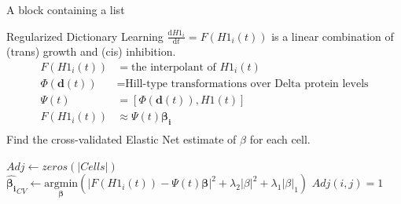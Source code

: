 \documentclass[final]{beamer}
\newlength{\colwidth}
\begin{document}
\begin{frame}[t]
\begin{columns}[t]
\begin{column}{\colwidth}
\begin{block}{A block containing a list}
  \end{block}

  \begin{alertblock}{Regularized Dictionary Learning}
    $\frac{\mathrm d \textit{H1}_i}{\mathrm dt} = F(\textit{H1}_i(t))$ is a linear combination of (trans) growth and (cis) inhibition.
    \begin{equation}\label{eq:state}
    \begin{split}
    F(\textit{H1}_i(t)) &= \text{the interpolant of } \textit{H1}_i(t)\\
    \Phi(\bm{d}(t)) &= \text{Hill-type transformations over Delta protein levels} \\
    \Psi(t) &=  \left[\Phi(\bm{d}(t)), \textit{H1}(t) \right] \\
    F(\textit{H1}_i(t)) &\approx \Psi(t) \bm{\beta_i} \\[1em]
    \end{split}
    \end{equation}
    Find the cross-validated Elastic Net estimate \cite{zou_regularization_2005} of $\beta$ for each cell.\\[1em]	
    \centering
    \begin{minipage}{0.7\textwidth}
      \begin{algorithmic}
        \STATE $Adj\gets zeros(|Cells|)$
        \STATE $\bm{\hat{\beta_i}}_{CV} \gets \underset{\bm{\beta}}{\mathrm{argmin}} \left( \big|F(H1_i(t)) - \Psi(t)\bm{\beta} \big|^2 + \lambda_2 \big| \beta \big|^2 + \lambda_1 \big|\beta \big|_1  \right)$
        \STATE $Adj(i,j) = 1$
        \ENDIF
        \ENDFOR
        \ENDFOR 
      \end{algorithmic}
    \end{minipage}
    \normalsize
  \end{alertblock}
  




\end{column}
\end{columns}
\end{frame}
\end{document}

